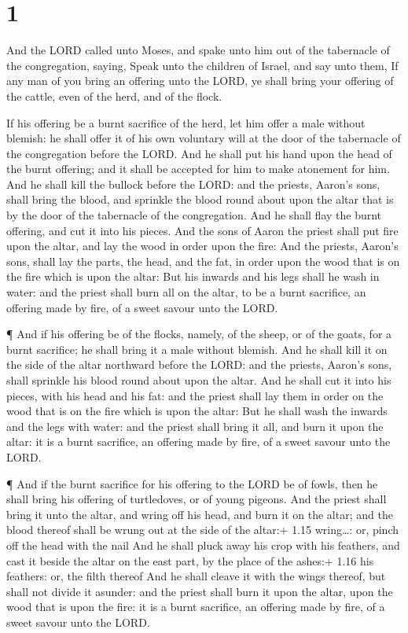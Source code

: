 \hypertarget{section}{%
\section{1}\label{section}}

 And the LORD called unto Moses, and spake unto him out of
the tabernacle of the congregation, saying,  Speak unto the
children of Israel, and say unto them, If any man of you bring an
offering unto the LORD, ye shall bring your offering of the cattle, even
of the herd, and of the flock.

 If his offering be a burnt sacrifice of the herd, let him
offer a male without blemish: he shall offer it of his own voluntary
will at the door of the tabernacle of the congregation before the LORD.
 And he shall put his hand upon the head of the burnt
offering; and it shall be accepted for him to make atonement for him.
 And he shall kill the bullock before the LORD: and the
priests, Aaron's sons, shall bring the blood, and sprinkle the blood
round about upon the altar that is by the door of the tabernacle of the
congregation.  And he shall flay the burnt offering, and cut
it into his pieces.  And the sons of Aaron the priest shall
put fire upon the altar, and lay the wood in order upon the fire:
 And the priests, Aaron's sons, shall lay the parts, the
head, and the fat, in order upon the wood that is on the fire which is
upon the altar:  But his inwards and his legs shall he wash
in water: and the priest shall burn all on the altar, to be a burnt
sacrifice, an offering made by fire, of a sweet savour unto the LORD.

 ¶ And if his offering be of the flocks, namely, of the
sheep, or of the goats, for a burnt sacrifice; he shall bring it a male
without blemish.  And he shall kill it on the side of the
altar northward before the LORD: and the priests, Aaron's sons, shall
sprinkle his blood round about upon the altar.  And he
shall cut it into his pieces, with his head and his fat: and the priest
shall lay them in order on the wood that is on the fire which is upon
the altar:  But he shall wash the inwards and the legs with
water: and the priest shall bring it all, and burn it upon the altar: it
is a burnt sacrifice, an offering made by fire, of a sweet savour unto
the LORD.

 ¶ And if the burnt sacrifice for his offering to the LORD
be of fowls, then he shall bring his offering of turtledoves, or of
young pigeons.  And the priest shall bring it unto the
altar, and wring off his head, and burn it on the altar; and the blood
thereof shall be wrung out at the side of the altar:+ 1.15 wring\ldots:
or, pinch off the head with the nail  And he shall pluck
away his crop with his feathers, and cast it beside the altar on the
east part, by the place of the ashes:+ 1.16 his feathers: or, the filth
thereof  And he shall cleave it with the wings thereof, but
shall not divide it asunder: and the priest shall burn it upon the
altar, upon the wood that is upon the fire: it is a burnt sacrifice, an
offering made by fire, of a sweet savour unto the LORD.

